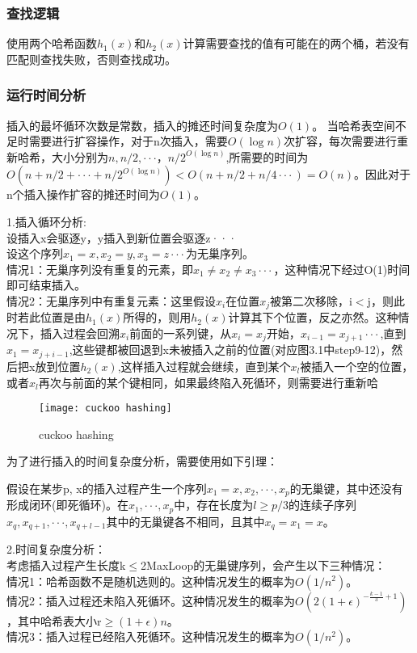 \subsubsection{查找逻辑}
使用两个哈希函数$h_1(x)$和$h_2(x)$计算需要查找的值有可能在的两个桶，若没有匹配则查找失败，否则查找成功。

\subsubsection{运行时间分析}
插入的最坏循环次数是常数，插入的摊还时间复杂度为$O(1)$。
当哈希表空间不足时需要进行扩容操作，对于n次插入，需要$O(\log n)$次扩容，每次需要进行重新哈希，大小分别为$n,n/2,···，n/2^{O(\log n)}$,所需要的时间为$O(n+n/2+···+n/2^{O(\log n)})<O(n+n/2+n/4···)=O(n)$。因此对于n个插入操作扩容的摊还时间为$O(1)$。

 1.插入循环分析:\\
设插入x会驱逐y，y插入到新位置会驱逐z···\\
设这个序列$x_1=x,x_2=y,x_3=z···$为无巢序列。\\
情况1：无巢序列没有重复的元素，即$x_1\ne x_2\ne x_3···$，这种情况下经过O(1)时间即可结束插入。\\
情况2：无巢序列中有重复元素：这里假设$x_i$在位置$x_j$被第二次移除，i$<$j，则此时若此位置是由$h_1(x)$所得的，则用$h_2(x)$计算其下个位置，反之亦然。这种情况下，插入过程会回溯$x_i$前面的一系列键，从$x_i=x_j$开始，$x_{i-1}=x_{j+1}···$,直到$x_1=x_{j+i-1}$,这些键都被回退到x未被插入之前的位置(对应图3.1中step9-12)，然后把x放到位置$h_2(x)$,这样插入过程就会继续，直到某个$x_l$被插入一个空的位置，或者$x_l$再次与前面的某个键相同，如果最终陷入死循环，则需要进行重新哈
\begin{figure}[h]
    \centering
    \texttt{[image: cuckoo hashing]}
    \caption{cuckoo hashing}
    \label{fig:cuckoo hashing}
\end{figure}
为了进行插入的时间复杂度分析，需要使用如下引理：
\begin{lemma}
假设在某步p, x的插入过程产生一个序列$x_1=x,x_2,···,x_p$的无巢键，其中还没有形成闭环(即死循环)。在$x_1,···,x_p$中，存在长度为$l\ge p/3$的连续子序列$x_q,x_{q + 1},···,x_{q + l−1}$其中的无巢键各不相同，且其中$x_q = x_1 = x$。
\end{lemma}
2.时间复杂度分析：\\
考虑插入过程产生长度k$\le$2MaxLoop的无巢键序列，会产生以下三种情况：\\
情况1：哈希函数不是随机选则的。这种情况发生的概率为$O(1/n^2)$。\\
情况2：插入过程还未陷入死循环。这种情况发生的概率为$O(2(1+\epsilon)^{-\frac{k-1}{3}+1})$，其中哈希表大小r$\ge (1+\epsilon)n$。\\
情况3：插入过程已经陷入死循环。这种情况发生的概率为$O(1/n^2)$。\\

